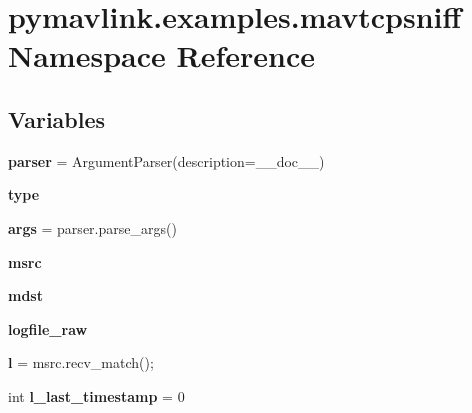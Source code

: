 \hypertarget{namespacepymavlink_1_1examples_1_1mavtcpsniff}{}\section{pymavlink.\+examples.\+mavtcpsniff Namespace Reference}
\label{namespacepymavlink_1_1examples_1_1mavtcpsniff}
\subsection*{Variables}
\begin{DoxyCompactItemize}
\item 
\mbox{\label{namespacepymavlink_1_1examples_1_1mavtcpsniff_ad940e3269568b6625c9ab6ee1759ff71}} 
{\bfseries parser} = Argument\+Parser(description=\+\_\+\+\_\+doc\+\_\+\+\_\+)
\item 
\mbox{\label{namespacepymavlink_1_1examples_1_1mavtcpsniff_ae675c6bc45c6b431a36251a691509f5e}} 
{\bfseries type}
\item 
\mbox{\label{namespacepymavlink_1_1examples_1_1mavtcpsniff_a0ad33c6c70d40c78cfbcb6da67f6fe89}} 
{\bfseries args} = parser.\+parse\+\_\+args()
\item 
{\bfseries msrc}
\item 
{\bfseries mdst}
\item 
\mbox{\label{namespacepymavlink_1_1examples_1_1mavtcpsniff_aeb3d6543641bd44719e19f2fdd3badc0}} 
{\bfseries logfile\+\_\+raw}
\item 
\mbox{\label{namespacepymavlink_1_1examples_1_1mavtcpsniff_a310417b77149af2ebfa7d55cdfebce43}} 
{\bfseries l} = msrc.\+recv\+\_\+match();
\item 
\mbox{\label{namespacepymavlink_1_1examples_1_1mavtcpsniff_a2d1e873c3fd312f8dddb019f9099e0dd}} 
int {\bfseries l\+\_\+last\+\_\+timestamp} = 0
\item 
\mbox{\label{namespacepymavlink_1_1examples_1_1mavtcpsniff_ae6dab03b22f9c8b60bcd8eda49c01aee}} 

\end{DoxyCompactItemize}
